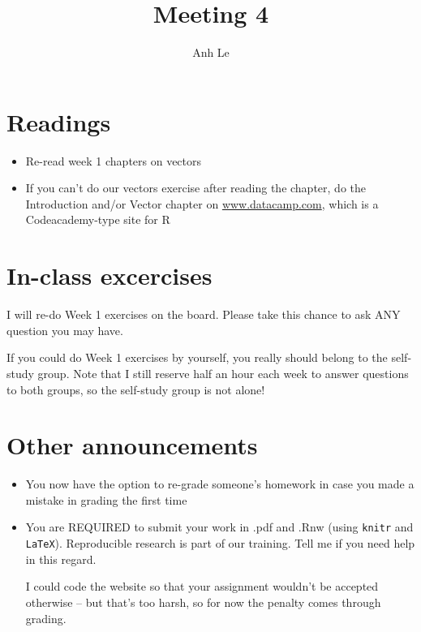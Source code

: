 \documentclass{article}\usepackage[]{graphicx}\usepackage[]{color}
\title{Meeting 4}
\author{Anh Le}
\begin{document}
\maketitle

\section{Readings}

\begin{itemize}
\item Re-read week 1 chapters on vectors
\item If you can't do our vectors exercise after reading the chapter, do the Introduction and/or Vector chapter on \url{www.datacamp.com}, which is a Codeacademy-type site for R
\end{itemize}

\section{In-class excercises}

I will re-do Week 1 exercises on the board. Please take this chance to ask ANY question you may have.

If you could do Week 1 exercises by yourself, you really should belong to the self-study group. Note that I still reserve half an hour each week to answer questions to both groups, so the self-study group is not alone!

\section{Other announcements}

\begin{itemize}
\item You now have the option to re-grade someone's homework in case you made a mistake in grading the first time
\item You are REQUIRED to submit your work in .pdf and .Rnw (using \verb`knitr` and \verb`LaTeX`). Reproducible research is part of our training. Tell me if you need help in this regard.

I could code the website so that your assignment wouldn't be accepted otherwise -- but that's too harsh, so for now the penalty comes through grading.
\end{itemize}
\end{document}
